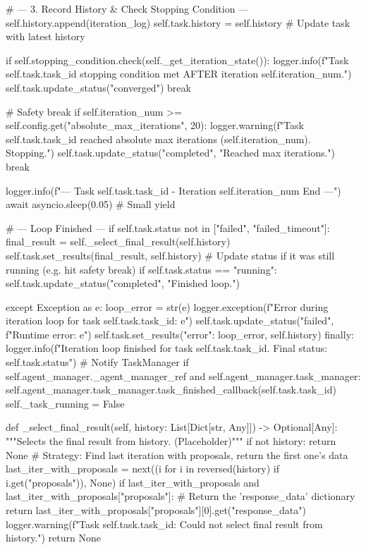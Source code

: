 \documentclass{amsbook}
\theoremstyle{definition}
\theoremstyle{remark}
\numberwithin{equation}{chapter} %
\begin{document}
\begin{python}
                # --- 3. Record History & Check Stopping Condition ---
                self.history.append(iteration_log)
                self.task.history = self.history # Update task with latest history

                if self.stopping_condition.check(self._get_iteration_state()):
                     logger.info(f"Task {self.task.task_id} stopping condition met AFTER iteration {self.iteration_num}.")
                     self.task.update_status("converged")
                     break

                # Safety break
                if self.iteration_num >= self.config.get("absolute_max_iterations", 20):
                    logger.warning(f"Task {self.task.task_id} reached absolute max iterations ({self.iteration_num}). Stopping.")
                    self.task.update_status("completed", "Reached max iterations.")
                    break

                logger.info(f"--- Task {self.task.task_id} - Iteration {self.iteration_num} End ---")
                await asyncio.sleep(0.05) # Small yield


            # --- Loop Finished ---
            if self.task.status not in ["failed", "failed_timeout"]:
                 final_result = self._select_final_result(self.history)
                 self.task.set_results(final_result, self.history)
                 # Update status if it was still running (e.g. hit safety break)
                 if self.task.status == "running":
                     self.task.update_status("completed", "Finished loop.")

        except Exception as e:
            loop_error = str(e)
            logger.exception(f"Error during iteration loop for task {self.task.task_id}: {e}")
            self.task.update_status("failed", f"Runtime error: {e}")
            self.task.set_results({"error": loop_error}, self.history)
        finally:
            logger.info(f"Iteration loop finished for task {self.task.task_id}. Final status: {self.task.status}")
            # Notify TaskManager
            if self.agent_manager._agent_manager_ref and self.agent_manager.task_manager:
                self.agent_manager.task_manager.task_finished_callback(self.task.task_id)
            self._task_running = False


    def _select_final_result(self, history: List[Dict[str, Any]]) -> Optional[Any]:
        """Selects the final result from history. (Placeholder)"""
        if not history: return None
        # Strategy: Find last iteration with proposals, return the first one's data
        last_iter_with_proposals = next((i for i in reversed(history) if i.get("proposals")), None)
        if last_iter_with_proposals and last_iter_with_proposals["proposals"]:
            # Return the 'response_data' dictionary
            return last_iter_with_proposals["proposals"][0].get("response_data")
        logger.warning(f"Task {self.task.task_id}: Could not select final result from history.")
        return None


\end{python}
\end{document}
